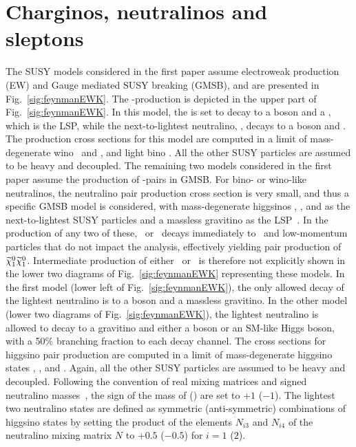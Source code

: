 \section{Charginos, neutralinos and sleptons}
The SUSY models considered in the first paper assume electroweak production (EW) and Gauge mediated SUSY breaking (GMSB), and are presented in Fig.~\ref{sig:feynmanEWK}. 
The \firstcharg-\secondchi production is depicted in the upper part of Fig.~\ref{sig:feynmanEWK}. 
In this model, the \firstcharg is set to decay to a \PW boson and a \firstchi, which is the LSP, while the next-to-lightest neutralino, \secondchi, decays to a \PZ boson and \firstchi.
The production cross sections for this model are computed in a limit of mass-degenerate wino \firstcharg\ and \secondchi, and light bino \firstchi.  
All the other SUSY particles are assumed to be heavy and decoupled.
The remaining two models considered in the first paper assume the production of \firstchi-\firstchi pairs in GMSB.
For bino- or wino-like neutralinos, the neutralino pair production cross section is very small, and thus a specific GMSB model is considered, with mass-degenerate higgsinos \firstcharg, \secondchi, and \firstchi as the next-to-lightest SUSY particles and a massless gravitino as the LSP~\cite{Matchev:1999ft,Meade:2009qv,Ruderman}.
In the production of any two of these, \firstcharg\ or \secondchi\ decays immediately to \firstchi\ and low-momentum particles that do not impact the analysis, effectively yielding pair production of $\widetilde{\chi}^{0}_{1}\widetilde{\chi}^{0}_{1}$.
Intermediate production of either \firstcharg\ or \secondchi\ is therefore not explicitly shown in the lower two diagrams of Fig.~\ref{sig:feynmanEWK} representing these models.
In the first model (lower left of Fig.~\ref{sig:feynmanEWK}), the only allowed decay of the lightest neutralino is to a \PZ boson and a massless gravitino.
In the other model (lower two diagrams of Fig.~\ref{sig:feynmanEWK}), the lightest neutralino is allowed to decay to a gravitino and either a \PZ boson or an SM-like Higgs boson, with a 50\% branching fraction to each decay channel.
The cross sections for higgsino pair production are computed in a limit of mass-degenerate higgsino states \secondchi, \firstcharg, and \firstchi.
Again, all the other SUSY particles are assumed to be heavy and decoupled.
Following the convention of real mixing matrices and signed neutralino masses~\cite{Skands:2003cj}, the sign of the mass of \firstchi (\secondchi) are set to $+1$ ($-1$).
The lightest two neutralino states are defined as symmetric (anti-symmetric) combinations of higgsino states by setting the product of the elements $N_{i3}$ and $N_{i4}$ of the neutralino mixing matrix $N$ to $+0.5$ ($-0.5$) for $i = 1$ ($2$).
